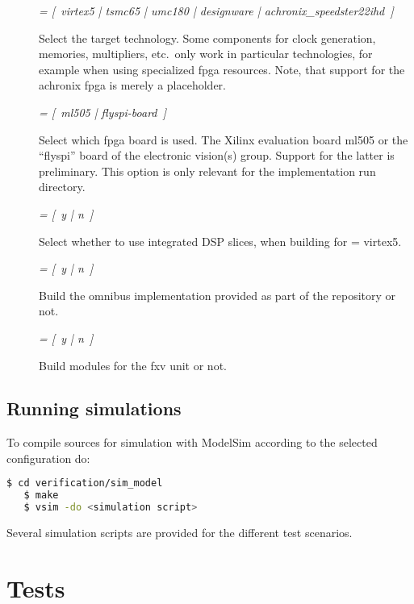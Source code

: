 \begin{description}
    \item[] \textit{= [~virtex5 | tsmc65 | umc180 | designware | achronix\_speedster22ihd~]}

        Select the target technology.
        Some components for clock generation, memories, multipliers, etc.\ only work in particular technologies, for example when using specialized \gls{fpga} resources.
        Note, that support for the achronix \gls{fpga} is merely a placeholder.

    \item[] \textit{= [~ml505 | flyspi-board~]}

        Select which \gls{fpga} board is used.
        The Xilinx evaluation board ml505 \citep{ml505_ug_2008} or the ``flyspi'' board of the electronic vision(s) group.
        Support for the latter is preliminary.
        This option is only relevant for the  implementation run directory.

    \item[] \textit{= [~y | n~]}

        Select whether to use integrated DSP slices, when building for  = virtex5.

    \item[] \textit{= [~y | n~]}

        Build the \gls{omnibus} implementation provided as part of the repository or not.


    \item[] \textit{= [~y | n~]}

        Build modules for the \gls{fxv} unit or not.
\end{description}


\subsection{Running simulations}

To compile sources for simulation with ModelSim according to the selected configuration do:
\begin{lstlisting}[language=bash]
   $ cd verification/sim_model
   $ make
   $ vsim -do <simulation script>
\end{lstlisting}
Several simulation scripts are provided for the different test scenarios.

\section{Tests}

